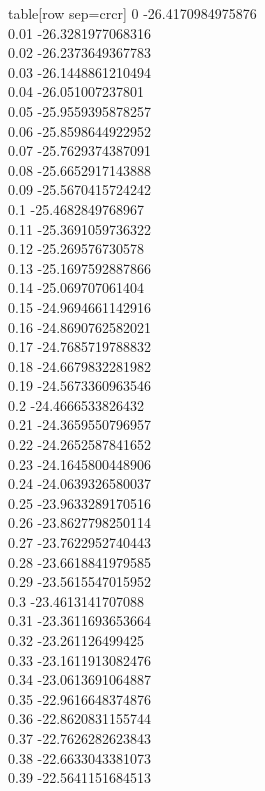   table[row sep=crcr]{%
0	-26.4170984975876\\
0.01	-26.3281977068316\\
0.02	-26.2373649367783\\
0.03	-26.1448861210494\\
0.04	-26.051007237801\\
0.05	-25.9559395878257\\
0.06	-25.8598644922952\\
0.07	-25.7629374387091\\
0.08	-25.6652917143888\\
0.09	-25.5670415724242\\
0.1	-25.4682849768967\\
0.11	-25.3691059736322\\
0.12	-25.269576730578\\
0.13	-25.1697592887866\\
0.14	-25.069707061404\\
0.15	-24.9694661142916\\
0.16	-24.8690762582021\\
0.17	-24.7685719788832\\
0.18	-24.6679832281982\\
0.19	-24.5673360963546\\
0.2	-24.4666533826432\\
0.21	-24.3659550796957\\
0.22	-24.2652587841652\\
0.23	-24.1645800448906\\
0.24	-24.0639326580037\\
0.25	-23.9633289170516\\
0.26	-23.8627798250114\\
0.27	-23.7622952740443\\
0.28	-23.6618841979585\\
0.29	-23.5615547015952\\
0.3	-23.4613141707088\\
0.31	-23.3611693653664\\
0.32	-23.261126499425\\
0.33	-23.1611913082476\\
0.34	-23.0613691064887\\
0.35	-22.9616648374876\\
0.36	-22.8620831155744\\
0.37	-22.7626282623843\\
0.38	-22.6633043381073\\
0.39	-22.5641151684513\\
}
